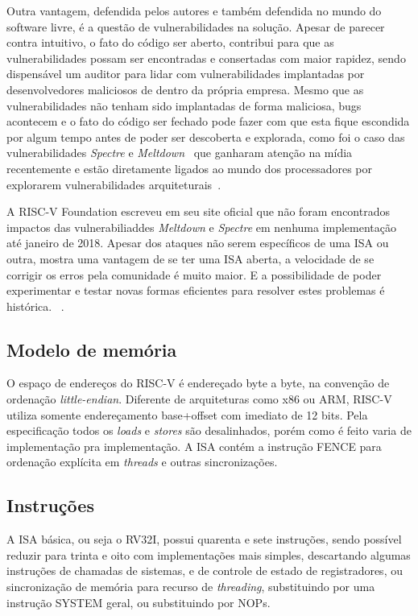 		Outra vantagem, defendida pelos autores e também defendida no mundo do software livre, é a questão de vulnerabilidades na solução. Apesar de parecer contra intuitivo, o fato do código ser aberto, contribui para que as vulnerabilidades possam 	ser encontradas e consertadas com maior rapidez, sendo dispensável um auditor para lidar com vulnerabilidades implantadas por desenvolvedores maliciosos de dentro da própria empresa. Mesmo que as vulnerabilidades não tenham sido implantadas de forma maliciosa, bugs acontecem e o fato do código ser fechado pode fazer com que esta fique escondida por algum tempo antes de poder ser descoberta e explorada, como foi o caso das vulnerabilidades \textit{Spectre} e \textit{Meltdown}~\cite{meltdown_spectre_exploits} que ganharam atenção na mídia recentemente e estão diretamente ligados ao mundo dos processadores por explorarem vulnerabilidades arquiteturais~\cite{meltdown_spectre_media}.

		A RISC-V Foundation escreveu em seu site oficial que não foram encontrados impactos das vulnerabiliaddes \textit{Meltdown} e \textit{Spectre} em nenhuma implementação até janeiro de 2018. Apesar dos ataques não serem específicos de uma ISA ou outra, mostra uma vantagem de se ter uma ISA aberta, a velocidade de se corrigir os erros pela comunidade é muito maior. E a possibilidade de poder experimentar e testar novas formas eficientes para resolver estes problemas é histórica. ~\cite{riscv_security}.

	\subsection{Modelo de memória}
	
		O espaço de endereços do RISC-V é endereçado byte a byte, na convenção de ordenação \textit{little-endian}. Diferente de arquiteturas como x86 ou ARM, RISC-V utiliza somente endereçamento base+offset com imediato de 12 bits. Pela especificação todos os \textit{loads} e \textit{stores} são desalinhados, porém como é feito varia de implementação pra implementação. A ISA contém a instrução FENCE para ordenação explícita em \textit{threads} e outras sincronizações.

	\subsection{Instruções}

		A ISA básica, ou seja o RV32I, possui quarenta e sete instruções, sendo possível reduzir para trinta e oito com implementações mais simples, descartando algumas instruções de chamadas de sistemas, e de controle de estado de registradores, ou sincronização de memória para recurso de \textit{threading}, substituindo por uma instrução SYSTEM geral, ou substituindo por NOPs.
	
